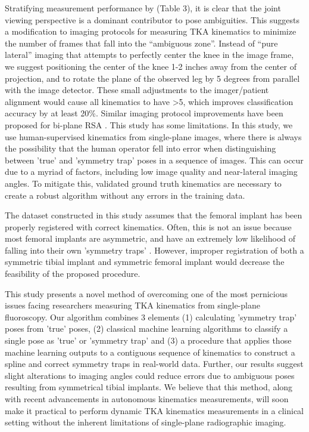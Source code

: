 Stratifying measurement performance by  (Table 3), it is clear that the joint viewing perspective is a dominant contributor to pose ambiguities.
This suggests a modification to imaging protocols for measuring TKA kinematics to minimize the number of frames that fall into the “ambiguous zone”.
Instead of “pure lateral” imaging that attempts to perfectly center the knee in the image frame, we suggest positioning the center of the knee 1-2 inches away from the center of projection, and to rotate the plane of the observed leg by 5 degrees from parallel with the image detector.
These small adjustments to the imager/patient alignment would cause all kinematics to have >5, which improves classification accuracy by at least 20\%. Similar imaging protocol improvements have been proposed for bi-plane RSA \cite{niesenReorientingTibialBaseplate2020}.
This study has some limitations. In this study, we use human-supervised kinematics from single-plane images, where there is always the possibility that the human operator fell into error when distinguishing between 'true' and 'symmetry trap' poses in a sequence of images. This can occur due to a myriad of factors, including low image quality and near-lateral imaging angles. To mitigate this, validated ground truth kinematics are necessary to create a robust algorithm without any errors in the training data.


The dataset constructed in this study assumes that the femoral implant has been properly registered with correct kinematics.
Often, this is not an issue because most femoral implants are asymmetric, and have an extremely low likelihood of falling into their own 'symmetry traps' \cite{jensenJointTrackMachine2023}.
However, improper registration of both a symmetric tibial implant and symmetric femoral implant would decrease the feasibility of the proposed procedure.


This study presents a novel method of overcoming one of the most pernicious issues facing researchers measuring TKA kinematics from single-plane fluoroscopy.
Our algorithm combines 3 elements (1) calculating 'symmetry trap' poses from 'true' poses, (2) classical machine learning algorithms to classify a single pose as 'true' or 'symmetry trap' and (3) a procedure that applies those machine learning outputs to a contiguous sequence of kinematics to construct a spline and correct symmetry traps in real-world data.
Further, our results suggest slight alterations to imaging angles could reduce errors due to ambiguous poses resulting from symmetrical tibial implants.
We believe that this method, along with recent advancements in autonomous kinematics measurements, will soon make it practical to perform dynamic TKA kinematics measurements in a clinical setting without the inherent limitations of single-plane radiographic imaging.


